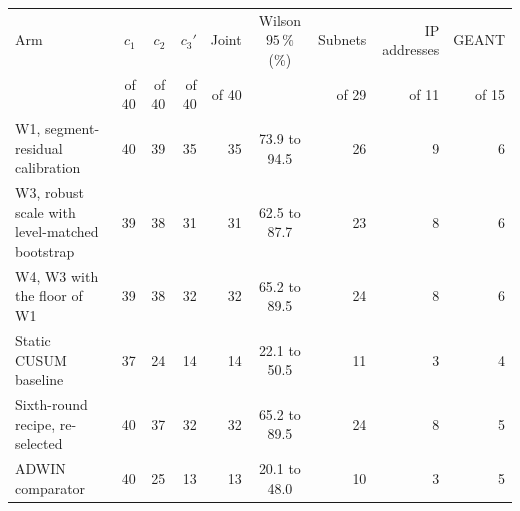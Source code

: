 {\footnotesize\setlength{\tabcolsep}{3pt}
\begin{tabular}{@{}p{4.4cm}rrrrcrrr@{}}
\toprule
Arm & $c_1$ & $c_2$ & $c_3'$ & Joint & Wilson $95\,\%$ (\%) & Subnets & IP addresses & GEANT \\
 & of 40 & of 40 & of 40 & of 40 & & of 29 & of 11 & of 15 \\
\midrule
W1, segment-residual calibration & 40 & 39 & 35 & 35 & 73.9 to 94.5 & 26 & 9 & 6 \\
W3, robust scale with level-matched bootstrap & 39 & 38 & 31 & 31 & 62.5 to 87.7 & 23 & 8 & 6 \\
W4, W3 with the floor of W1 & 39 & 38 & 32 & 32 & 65.2 to 89.5 & 24 & 8 & 6 \\
Static CUSUM baseline & 37 & 24 & 14 & 14 & 22.1 to 50.5 & 11 & 3 & 4 \\
Sixth-round recipe, re-selected & 40 & 37 & 32 & 32 & 65.2 to 89.5 & 24 & 8 & 5 \\
ADWIN comparator & 40 & 25 & 13 & 13 & 20.1 to 48.0 & 10 & 3 & 5 \\
\bottomrule
\end{tabular}
}
